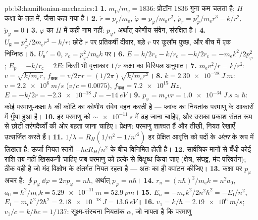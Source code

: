 \begin{solution}{pb:b3:hamiltonian-mechanics:1}
\textbf{1.} $m_{\text{p}}/m_{\text{e}} = 1836$: प्रोटॉन 1836
गुना कम चलता है; $H$ कक्षा के तल में, जैसा कहा गया है।
\textbf{2.} $\dot r = p_r/m_{\text{e}}$, $\dot\varphi =
p_\varphi/m_{\text{e}}r^2$, $\dot p_r = p_\varphi^2/m_{\text{e}}r^3 -
k/r^2$, $\dot p_\varphi = 0$।
\textbf{3.} $\varphi$ का $H$ में कहीं नाम नहीं: $p_\varphi$, अर्थात् कोणीय
संवेग, संरक्षित है।
\textbf{4.} $U_{\text{प्र}} = p_\varphi^2/2m_{\text{e}}r^2 - k/r$:
छोटे $r$ पर प्रतिकर्षी दीवार, बड़े $r$ पर कूलॉम पुच्छ, और बीच में एक
निम्निष्ठ।
\textbf{5.} $U_{\text{प्र}}' = 0$, $r_{\text{c}} =
p_\varphi^2/m_{\text{e}}k$ पर।
\textbf{6.} $E = k/2r_{\text{c}} - k/r_{\text{c}} = -k/2r_{\text{c}} =
-m_{\text{e}}k^2/2p_\varphi^2$; $E_p = -k/r_{\text{c}} = 2E$: किसी भी
वृत्ताकार $1/r$ कक्षा का विरियल अनुपात।
\textbf{7.} $m_{\text{e}}v^2/r = k/r^2$: $v = \sqrt{k/m_{\text{e}}r}$,
$f_{\text{कक्ष}} = v/2\pi r = (1/2\pi)\sqrt{k/m_{\text{e}}r^3}$।
\textbf{8.} $k = \qty{2.30e-28}{J.m}$: $v = \qty{2.2e6}{m/s}$ ($v/c =
0.0075$), $f_{\text{कक्ष}} = \qty{7.2e15}{Hz}$, $E = -k/2r =
\qty{-2.3e-18}{J} = \qty{-14}{eV}$।
\textbf{9.} $p_\varphi = m_{\text{e}}vr = \qty{1.0e-34}{J.s} \approx
\hbar$: कोई परमाणु-कक्षा $\hbar$ की कोटि का कोणीय संवेग वहन करती है
--- प्लांक का नियतांक परमाणु के आकारों में गुँथा हुआ है।
\textbf{10.} हर परमाणु को $\sim\qty{e-11}{s}$ में ढह जाना चाहिए, और
उसका प्रकाश संतत रूप से छोटी तरंगदैर्घ्यों की ओर बहता जाना चाहिए।
प्रेक्षण: परमाणु शाश्वत हैं और तीखी, नियत रेखाएँ उत्सर्जित करते हैं।
\textbf{11.} $1/\lambda = R_H(1/n^2 - 1/n'^2)$ हर प्रेक्षित आवृत्ति को
पदों के \emph{अंतर} के रूप में लिखता है: ऊर्जा नियत स्तरों
$-hcR_H/n^2$ के बीच विनिमित होती है।
\textbf{12.} सार्वत्रिक मानों से बँधी कोई राशि तब नहीं खिसकनी चाहिए जब
परमाणु को हल्के से विक्षुब्ध किया जाए (क्षेत्र, संघट्ट, मंद परिवर्तन);
 ठीक वही है जो मंद विक्षोभ के अंतर्गत
नियत रहता है --- अतः  का ही क्वांटन कीजिए।
\textbf{13.} कक्षा पर $p_\varphi$ अचर है: $\oint
p_\varphi\,\dd\varphi = 2\pi p_\varphi = nh$, अर्थात् $p_\varphi =
n\hbar$।
\textbf{14.} $r_n = (n\hbar)^2/m_{\text{e}}k = n^2a_0$, $a_0 =
\hbar^2/m_{\text{e}}k = \qty{5.29e-11}{m} = \qty{52.9}{pm}$।
\textbf{15.} $E_n = -m_{\text{e}}k^2/2n^2\hbar^2 = -E_{\text{I}}/n^2$,
$E_{\text{I}} = m_{\text{e}}k^2/2\hbar^2 = \qty{2.18e-18}{J} =
\qty{13.6}{eV}$।
\textbf{16.} $v_1 = k/\hbar = \qty{2.19e6}{m/s}$; $v_1/c = k/\hbar c =
1/137$: सूक्ष्म-संरचना नियतांक $\alpha$, जो नापता है कि परमाणु

\end{solution}
